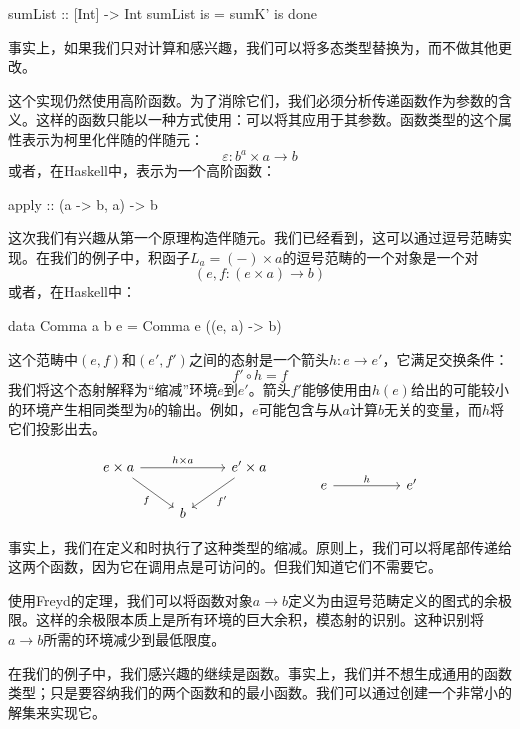 \documentclass[DaoFP]{subfiles}
\begin{document}
    \begin{haskell}
        sumList :: [Int] -> Int
        sumList is = sumK' is done
    \end{haskell}

    事实上，如果我们只对计算和感兴趣，我们可以将多态类型替换为，而不做其他更改。

    这个实现仍然使用高阶函数。为了消除它们，我们必须分析传递函数作为参数的含义。这样的函数只能以一种方式使用：可以将其应用于其参数。函数类型的这个属性表示为柯里化伴随的伴随元：
    \[ \varepsilon \colon b^a \times a \to b \]
    或者，在Haskell中，表示为一个高阶函数：
    \begin{haskell}
        apply :: (a -> b, a) -> b
    \end{haskell}
    这次我们有兴趣从第一个原理构造伴随元。我们已经看到，这可以通过逗号范畴实现。在我们的例子中，积函子$L_a = (-) \times a$的逗号范畴的一个对象是一个对
    \[(e, f \colon (e \times a) \to b) \]
    或者，在Haskell中：
    \begin{haskell}
        data Comma a b e = Comma e ((e, a) -> b)
    \end{haskell}
    这个范畴中$(e, f)$和$(e', f')$之间的态射是一个箭头$h \colon e \to e'$，它满足交换条件：
    \[ f' \circ h = f \]
    我们将这个态射解释为“缩减”环境$e$到$e'$。箭头$f'$能够使用由$h (e)$给出的可能较小的环境产生相同类型为$b$的输出。例如，$e$可能包含与从$a$计算$b$无关的变量，而$h$将它们投影出去。

    \[
        \begin{tikzcd}
            e \times a
            \arrow[rd, "f"']
            \arrow[rr, "h \times a"]
            && e' \times a
            \arrow[ld, "f'"]
            \\
            &b
        \end{tikzcd}
        \hspace{30pt}
        \begin{tikzcd}
            e
            \arrow[rr, "h"]
            && e'
        \end{tikzcd}
    \]


    事实上，我们在定义和时执行了这种类型的缩减。原则上，我们可以将尾部传递给这两个函数，因为它在调用点是可访问的。但我们知道它们不需要它。

    使用Freyd的定理，我们可以将函数对象$a \to b$定义为由逗号范畴定义的图式的余极限。这样的余极限本质上是所有环境的巨大余积，模态射的识别。这种识别将$a \to b$所需的环境减少到最低限度。

    在我们的例子中，我们感兴趣的继续是函数。事实上，我们并不想生成通用的函数类型；只是要容纳我们的两个函数和的最小函数。我们可以通过创建一个非常小的解集来实现它。
\end{document}
